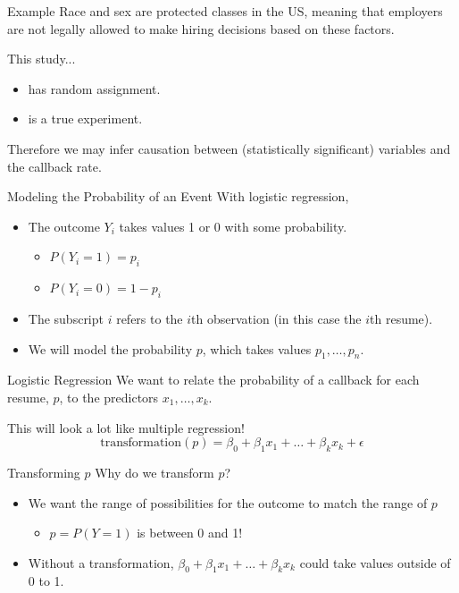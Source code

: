 \begin{frame}{Example}
    Race and sex are protected classes in the US, meaning that employers are not legally allowed to make hiring decisions based on these factors.
    
    \vspace{12pt} This study...
    \begin{itemize}
        \item has random assignment.
        \item is a true experiment.
    \end{itemize}
    
    \vspace{12pt}Therefore we may infer causation between (statistically significant) variables and the callback rate.
\end{frame}

\begin{frame}{Modeling the Probability of an Event}
    With logistic regression,
    \begin{itemize}
        \item The outcome $Y_i$ takes values 1 or 0 with some probability.
        \begin{itemize}
            \item $P(Y_i = 1) = p_i$
            \item $P(Y_i = 0) = 1-p_i$
        \end{itemize}
        \item The subscript $i$ refers to the $i$th observation (in this case the $i$th resume).
        \item We will model the probability $p$, which takes values $p_1, \dots, p_n$.
    \end{itemize}
\end{frame}

\begin{frame}{Logistic Regression}
    We want to relate the probability of a callback for each resume, $p$, to the predictors $x_1, \dots, x_k$. 
    
    \vspace{12pt}This will look a lot like multiple regression!
    \[
    \text{transformation}(p) = \beta_0 + \beta_1x_1 + \dots + \beta_kx_k + \epsilon
    \]
\end{frame}

\begin{frame}{Transforming $p$}
    Why do we transform $p$?
    
    \vspace{12pt}\begin{itemize}
        \item We want the range of possibilities for the outcome to match the range of $p$
        \begin{itemize}
            \item $p = P(Y=1)$ is between 0 and 1!
        \end{itemize}
        \item Without a transformation, $\beta_0 + \beta_1x_1 + \dots + \beta_kx_k$ could take values outside of 0 to 1.
    \end{itemize}
\end{frame}

